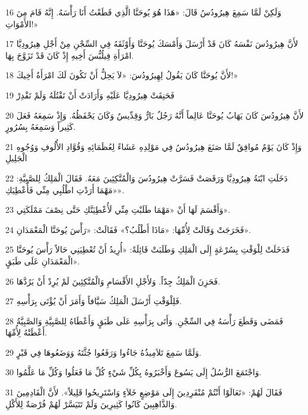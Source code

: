 \par 16 وَلَكِنْ لَمَّا سَمِعَ هِيرُودُسُ قَالَ: «هَذَا هُوَ يُوحَنَّا الَّذِي قَطَعْتُ أَنَا رَأْسَهُ. إِنَّهُ قَامَ مِنَ الأَمْوَاتِ!»
\par 17 لأَنَّ هِيرُودُسَ نَفْسَهُ كَانَ قَدْ أَرْسَلَ وَأَمْسَكَ يُوحَنَّا وَأَوْثَقَهُ فِي السِّجْنِ مِنْ أَجْلِ هِيرُودِيَّا امْرَأَةِ فِيلُبُّسَ أَخِيهِ إِذْ كَانَ قَدْ تَزَوَّجَ بِهَا.
\par 18 لأَنَّ يُوحَنَّا كَانَ يَقُولُ لِهِيرُودُسَ: «لاَ يَحِلُّ أَنْ تَكُونَ لَكَ امْرَأَةُ أَخِيكَ!»
\par 19 فَحَنِقَتْ هِيرُودِيَّا عَلَيْهِ وَأَرَادَتْ أَنْ تَقْتُلَهُ وَلَمْ تَقْدِرْ
\par 20 لأَنَّ هِيرُودُسَ كَانَ يَهَابُ يُوحَنَّا عَالِماً أَنَّهُ رَجُلٌ بَارٌّ وَقِدِّيسٌ وَكَانَ يَحْفَظُهُ. وَإِذْ سَمِعَهُ فَعَلَ كَثِيراً وَسَمِعَهُ بِسُرُورٍ.
\par 21 وَإِذْ كَانَ يَوْمٌ مُوافِقٌ لَمَّا صَنَعَ هِيرُودُسُ فِي مَوْلِدِهِ عَشَاءً لِعُظَمَائِهِ وَقُوَّادِ الأُلُوفِ وَوُجُوهِ الْجَلِيلِ
\par 22 دَخَلَتِ ابْنَةُ هِيرُودِيَّا وَرَقَصَتْ فَسَرَّتْ هِيرُودُسَ وَالْمُتَّكِئِينَ مَعَهُ. فَقَالَ الْمَلِكُ لِلصَّبِيَّةِ: «مَهْمَا أَرَدْتِ اطْلُبِي مِنِّي فَأُعْطِيَكِ».
\par 23 وَأَقْسَمَ لَهَا أَنْ «مَهْمَا طَلَبْتِ مِنِّي لَأُعْطِيَنَّكِ حَتَّى نِصْفَ مَمْلَكَتِي».
\par 24 فَخَرَجَتْ وَقَالَتْ لِأُمِّهَا: «مَاذَا أَطْلُبُ؟» فَقَالَتْ: «رَأْسَ يُوحَنَّا الْمَعْمَدَانِ».
\par 25 فَدَخَلَتْ لِلْوَقْتِ بِسُرْعَةٍ إِلَى الْمَلِكِ وَطَلَبَتْ قَائِلَةً: «أُرِيدُ أَنْ تُعْطِيَنِي حَالاً رَأْسَ يُوحَنَّا الْمَعْمَدَانِ عَلَى طَبَقٍ».
\par 26 فَحَزِنَ الْمَلِكُ جِدّاً. وَلأَجْلِ الأَقْسَامِ وَالْمُتَّكِئِينَ لَمْ يُرِدْ أَنْ يَرُدَّهَا.
\par 27 فَلِلْوَقْتِ أَرْسَلَ الْمَلِكُ سَيَّافاً وَأَمَرَ أَنْ يُؤْتَى بِرَأْسِهِ.
\par 28 فَمَضَى وَقَطَعَ رَأْسَهُ فِي السِّجْنِ. وَأَتَى بِرَأْسِهِ عَلَى طَبَقٍ وَأَعْطَاهُ لِلصَّبِيَّةِ وَالصَّبِيَّةُ أَعْطَتْهُ لِأُمِّهَا.
\par 29 وَلَمَّا سَمِعَ تَلاَمِيذُهُ جَاءُوا وَرَفَعُوا جُثَّتَهُ وَوَضَعُوهَا فِي قَبْرٍ.
\par 30 وَاجْتَمَعَ الرُّسُلُ إِلَى يَسُوعَ وَأَخْبَرُوهُ بِكُلِّ شَيْءٍ كُلِّ مَا فَعَلُوا وَكُلِّ مَا عَلَّمُوا.
\par 31 فَقَالَ لَهُمْ: «تَعَالَوْا أَنْتُمْ مُنْفَرِدِينَ إِلَى مَوْضِعٍ خَلاَءٍ وَاسْتَرِيحُوا قَلِيلاً». لأَنَّ الْقَادِمِينَ وَالذَّاهِبِينَ كَانُوا كَثِيرِينَ وَلَمْ تَتَيَسَّرْ لَهُمْ فُرْصَةٌ لِلأَكْلِ.
